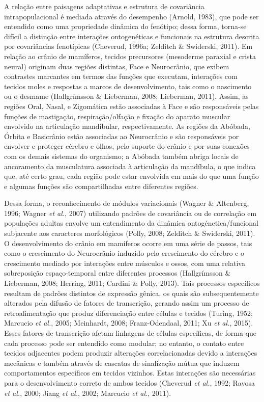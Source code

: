 \documentclass[12pt,twoside]{report}
\begin{document}
A relação entre paisagens adaptativas e estrutura de covariância
intrapopulacional é mediada através do desempenho (Arnold, 1983), que
pode ser entendido como uma propriedade dinâmica do fenótipo; dessa
forma, torna-se difícil a distinção entre interações ontogenéticas e
funcionais na estrutura descrita por covariâncias fenotípicas (Cheverud,
1996a; Zelditch \& Swiderski, 2011). Em relação ao crânio de mamíferos,
tecidos precursores (mesoderme paraxial e crista neural) originam duas
regiões distintas, Face e Neurocrânio, que exibem contrastes marcantes
em termos das funções que executam, interações com tecidos moles e
respostas a marcos de desenvolvimento, tais como o nascimento ou o
desmame (Hallgrímsson \& Lieberman, 2008; Lieberman, 2011). Assim, as
regiões Oral, Nasal, e Zigomática estão associadas à Face e são
responsáveis pelas funções de mastigação, respiração/olfação e fixação
do aparato muscular envolvido na articulação mandibular,
respectivamente. As regiões da Abóbada, Órbita e Basicrânio estão
associadas ao Neurocrânio e são responsáveis por envolver e proteger
cérebro e olhos, pelo suporte do crânio e por suas conexões com os
demais sistemas do organismo; a Abóbada também abriga locais de
ancoramento da musculatura associada à articulação da mandíbula, o que
indica que, até certo grau, cada região pode estar envolvida em mais do
que uma função e algumas funções são compartilhadas entre diferentes
regiões.

Dessa forma, o reconhecimento de módulos variacionais (Wagner \&
Altenberg, 1996; Wagner \emph{et al.}, 2007) utilizando padrões de
covariância ou de correlação em populações adultas envolve um
entendimento da dinâmica ontogénetica/funcional subjacente aos
caracteres morfológicos (Polly, 2008; Zelditch \& Swiderski, 2011). O
desenvolvimento do crânio em mamíferos ocorre em uma série de passos,
tais como o crescimento do Neurocrânio induzido pelo crescimento do
cérebro e o crescimento mediado por interações entre músculos e ossos,
com uma relativa sobreposição espaço-temporal entre diferentes processos
(Hallgrímsson \& Lieberman, 2008; Herring, 2011; Cardini \& Polly,
2013). Tais processos específicos resultam de padrões distintos de
expressão gênica, os quais são subsequentemente alterados pela difusão
de fatores de transcrição, gerando assim um processo de retroalimentação
que produz diferenciação entre células e tecidos (Turing, 1952; Marcucio
\emph{et al.}, 2005; Meinhardt, 2008; Franz-Odendaal, 2011; Xu \emph{et
al.}, 2015). Esses fatores de transcrição afetam linhagens de células
específicas, de forma que cada processo pode ser entendido como modular;
no entanto, o contato entre tecidos adjacentes podem produzir alterações
correlacionadas devido a interações mecânicas e também através de
cascatas de sinalização mútua que induzem comportamentos específicos em
tecidos vizinhos. Estas interações são necessárias para o
desenvolvimento correto de ambos tecidos (Cheverud \emph{et al.}, 1992;
Ravosa \emph{et al.}, 2000; Jiang \emph{et al.}, 2002; Marcucio \emph{et
al.}, 2011).
\end{document}
